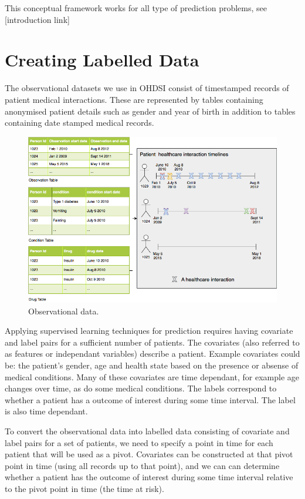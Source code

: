 \documentclass[11pt]{book}
\begin{document}
This conceptual framework works for all type of prediction problems, see
{[}introduction link{]}

\hypertarget{extracted}{\section{Creating Labelled
Data}\label{extracted}}

The observational datasets we use in OHDSI consist of timestamped
records of patient medical interactions. These are represented by tables
containing anonymised patient details such as gender and year of birth
in addition to tables containing date stamped medical records.

\begin{figure}
\includegraphics[width=1\linewidth]{images/PatientLevelPrediction/theory/patienttimeline} \caption{Observational data.}\label{fig:figuretheory1}
\end{figure}

Applying supervised learning techniques for prediction requires having
covariate and label pairs for a sufficient number of patients. The
covariates (also referred to as features or independant variables)
describe a patient. Example covariates could be: the patient's gender,
age and health state based on the presence or absense of medical
conditions. Many of these covariates are time dependant, for example age
changes over time, as do some medical conditions. The labels correspond
to whether a patient has a outcome of interest during some time
interval. The label is also time dependant.

To convert the observational data into labelled data consisting of
covariate and label pairs for a set of patients, we need to specify a
point in time for each patient that will be used as a pivot. Covariates
can be constructed at that pivot point in time (using all records up to
that point), and we can can determine whether a patient has the outcome
of interest during some time interval relative to the pivot point in
time (the time at risk).
\end{document}
